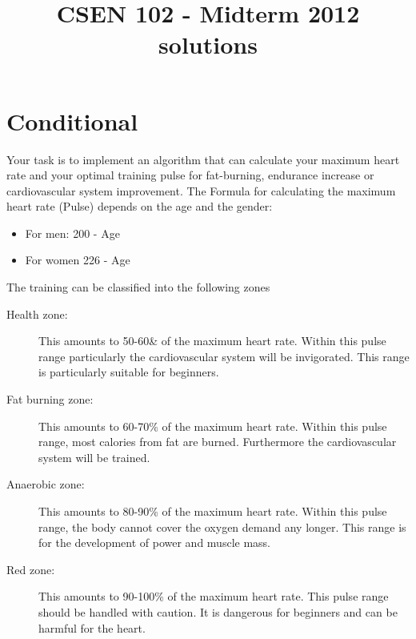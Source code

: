 \documentclass[11pt,a4paper]{article}
\begin{document}
\title{CSEN 102 - Midterm 2012 solutions}
\maketitle

\section{Conditional}
Your task is to implement an algorithm that can calculate your maximum heart rate and your optimal
training pulse for fat-burning, endurance increase or cardiovascular system improvement.
The Formula for calculating the maximum heart rate (Pulse) depends on the age and the gender:
\begin{itemize}
  \item For men: 200 - Age
  \item For women 226 - Age
\end{itemize}

The training can be classified into the following zones

\begin{description}
  \item[Health zone:] This amounts to 50-60\& of the maximum heart rate.
  Within this pulse range particularly the cardiovascular system will be invigorated. This range is
  particularly suitable for beginners.
  \item[Fat burning zone:] This amounts to 60-70\% of the maximum heart rate.
Within this pulse range, most calories from fat are burned. Furthermore the cardiovascular system
will be trained.
\item[Anaerobic zone:] This amounts to 80-90\% of the maximum heart rate.
Within this pulse range, the body cannot cover the oxygen demand any longer. This range is for
the development of power and muscle mass.

\item[Red zone:] This amounts to 90-100\% of the maximum heart rate.
This pulse range should be handled with caution. It is dangerous for beginners and can be harmful
for the heart.
\end{description}
\end{document}
